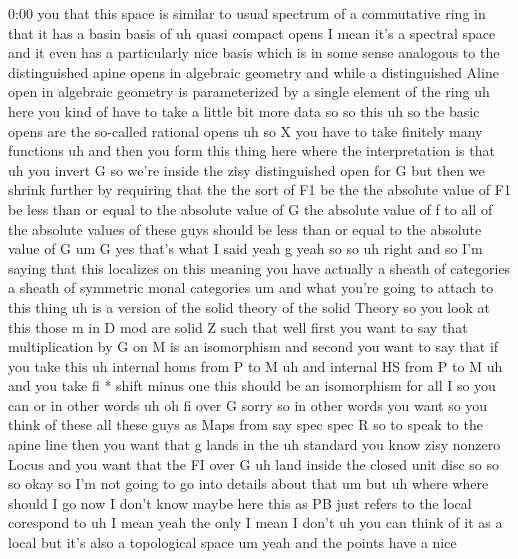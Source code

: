 \begin{unfinished}{0:00}
you  that  this  space  is  similar  to  usual
spectrum  of  a  commutative  ring  in  that
it  has  a  basin  basis  of  uh  quasi  compact
opens  I  mean  it's  a  spectral  space  and
it  even  has  a  particularly  nice  basis
which  is  in  some  sense  analogous  to  the
distinguished  apine  opens  in  algebraic
geometry  and  while  a  distinguished  Aline
open  in  algebraic  geometry  is
parameterized  by  a  single  element  of  the
ring  uh  here  you  kind  of  have  to  take  a
little  bit  more  data  so  so  this  uh  so
the  basic
opens  are  the  so-called  rational
opens  uh  so  X  you  have  to  take  finitely
many  functions  uh  and  then  you  form  this
thing  here  where  the  interpretation  is
that  uh  you  invert  G  so  we're  inside  the
zisy  distinguished  open  for  G  but  then
we  shrink  further  by  requiring  that  the
the  sort  of  F1  be  the  the  absolute  value
of  F1  be  less  than  or  equal  to  the
absolute  value  of  G  the  absolute  value
of  f  to  all  of  the  absolute  values  of
these  guys  should  be  less  than  or  equal
to  the  absolute  value  of
G  um
G  yes  that's  what  I  said  yeah  g  yeah  so
so
uh
right  and  so  I'm  saying  that  this
localizes  on  this  meaning  you  have
actually  a  sheath  of  categories  a  sheath
of  symmetric  monal  categories  um  and
what  you're  going  to  attach  to  this
thing  uh  is  a  version  of  the  solid
theory  of  the  solid  Theory  so  you  look
at  this  those  m  in  D  mod  are  solid
Z  such  that  well  first  you  want  to  say
that  multiplication  by  G  on  M  is  an
isomorphism  and  second  you  want  to  say
that  if  you  take  this  uh  internal  homs
from  P  to  M  uh  and  internal  HS  from  P  to
M  uh  and  you  take  fi  *  shift  minus  one
this  should  be  an  isomorphism  for  all  I
so  you  can  or  in  other  words  uh  oh  fi
over  G
sorry  so  in  other  words  you  want  so  you
think  of  these  all  these  guys  as  Maps
from  say  spec  spec  R  so  to  speak  to  the
apine  line  then  you  want  that  g  lands  in
the  uh  standard  you  know  zisy  nonzero
Locus  and  you  want  that  the  FI  over  G  uh
land  inside  the  closed  unit
disc
so
so
so
okay  so  I'm  not  going  to  go  into  details
about  that  um
but  uh  where  where  should  I  go  now  I
don't  know  maybe
here  this  as  PB  just  refers  to  the  local
corespond
to
uh  I  mean  yeah  the  only  I  mean  I  don't
uh  you  can  think  of  it  as  a  local  but
it's  also  a  topological  space
um
yeah  and  the  points  have  a  nice

\end{unfinished}
